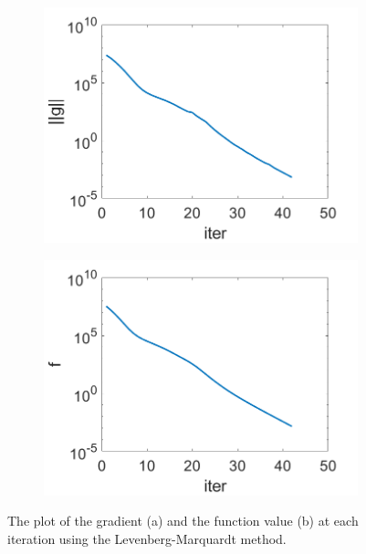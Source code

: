 \documentclass[12pt]{article}%
\begin{document}
\begin{figure}[H]
    \begin{subfigure}[b]{0.5\linewidth}
        \centering
        \includegraphics[width=\linewidth]{images/LM-gnorm.png}
        \caption{}
        \label{LM:a}
        \vspace{4ex}
    \end{subfigure}%
    \begin{subfigure}[b]{0.5\linewidth}
        \centering
        \includegraphics[width=\linewidth]{images/LM-f.png}
        \caption{}
        \label{LM:b}
        \vspace{4ex}
    \end{subfigure}
    \caption{The plot of the gradient (a) and the function value (b) at each iteration using the Levenberg-Marquardt method.}
    \label{LM}
\end{figure}
\end{document}
